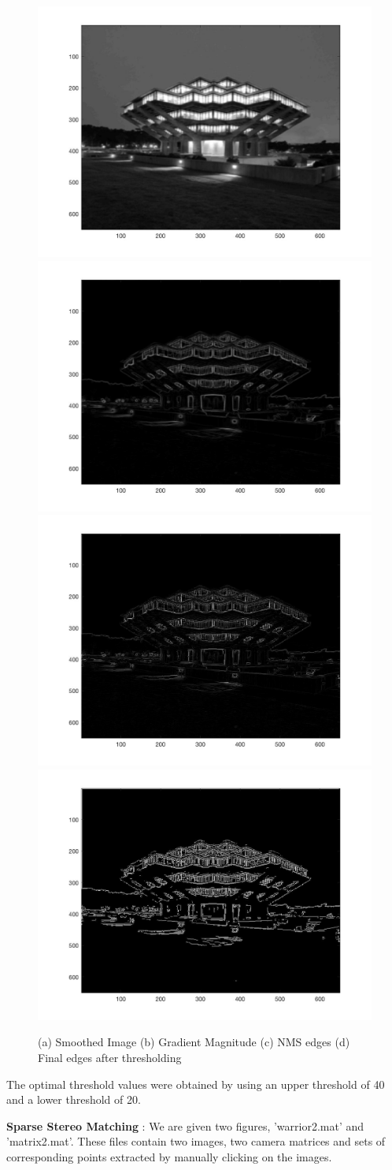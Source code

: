 \documentclass{assignment}
\begin{document}
\begin{problemlist}
\begin{figure}[H]
\centering
\includegraphics[width=0.4\columnwidth]{5_2}
\includegraphics[width=0.4\columnwidth]{5_3} \\
\includegraphics[width=0.4\columnwidth]{5_4}
\includegraphics[width=0.4\columnwidth]{5_5}
\caption{(a) Smoothed Image (b) Gradient Magnitude (c) NMS edges (d) Final edges after thresholding}
\label{fig:i5_1}
\end{figure}

The optimal threshold values were obtained by using an upper threshold of 40 and a lower threshold of 20.

\pbitem \textbf{Sparse Stereo Matching} : We are given two figures, 'warrior2.mat' and 'matrix2.mat'. These files contain two images, two camera matrices and sets of corresponding points extracted by manually clicking on the images. 


\end{problemlist}
\end{document}
